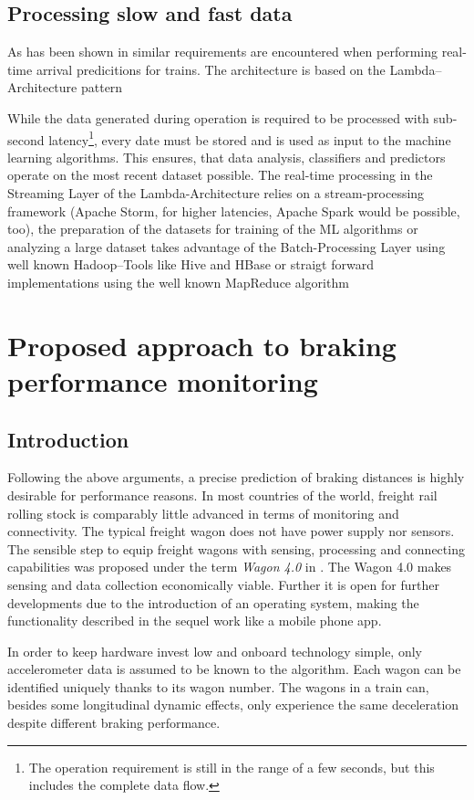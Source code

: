 \documentclass[a4paper, 12pt]{scrartcl}
\begin{document}
\subsection{Processing slow and fast data}
As has been shown in \cite{elsen:M318} similar requirements are encountered when performing real-time arrival predicitions for trains. The architecture is based on the Lambda--Architecture pattern \cite{Marz2015}

While the data generated during operation is required to be processed with sub-second latency\footnote{The operation requirement is still in the range of a few seconds, but this includes the complete data flow.}, every date must be stored and is used as input to the machine learning algorithms. This ensures, that data analysis, classifiers and predictors operate on the most recent dataset possible. The real-time processing in the Streaming Layer of the Lambda-Architecture relies on a stream-processing framework (Apache Storm, for higher latencies, Apache Spark would be possible, too), the preparation of the datasets for training of the ML algorithms or analyzing a large dataset takes advantage of the Batch-Processing Layer using well known Hadoop--Tools like Hive and HBase or straigt forward implementations using the well known MapReduce algorithm \cite{Dean:2004:MSD:1251254.1251264}


\section{Proposed approach to braking performance monitoring}
\subsection{Introduction}
Following the above arguments, a precise prediction of braking distances is highly desirable for performance reasons. In most countries of the world, freight rail rolling stock is comparably little advanced in terms of monitoring and connectivity. The typical freight wagon does not have power supply nor sensors. The sensible step to equip freight wagons with sensing, processing and connecting capabilities was proposed under the term \textit{Wagon 4.0} in \cite{pfaff2017stephenson}. The Wagon 4.0 makes sensing and data collection economically viable. Further it is open for further developments due to the introduction of an operating system, making the functionality described in the sequel work like a mobile phone app.

In order to keep hardware invest low and onboard technology simple, only accelerometer data is assumed to be known to the algorithm. Each wagon can be identified uniquely thanks to its wagon number. The wagons in a train can, besides some longitudinal dynamic effects, only experience the same deceleration despite different braking performance.
\end{document}
